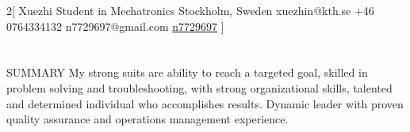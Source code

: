 \documentclass{my_cv}
\begin{document}
\begin{multicols}{2}[
        {Xuezhi}%
        {Student in Mechatronics}%
        {Stockholm, Sweden}%
        {xuezhin@kth.se}%
        {+46 0764334132}%
        {n7729697@gmail.com}%
        {\faGithub \href{https://github.com/n7729697}{n7729697}}%
]
\end{multicols}

\section{\faFileText}{SUMMARY}
My strong suits are ability to reach a targeted goal, skilled in problem solving and troubleshooting, with strong organizational skills, talented and determined individual who accomplishes results. Dynamic leader with proven quality assurance and operations management experience.
\end{document}
